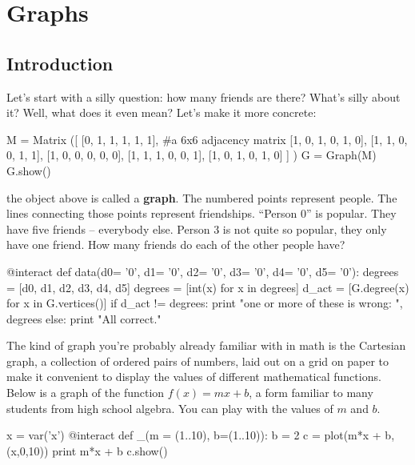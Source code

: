 \chapter{Graphs}

\section{Introduction}

Let's start with a silly question:  how many friends are there?
What's silly about it?  Well, what does it even mean?  Let's make it
more concrete:

\begin{sageverbatim}
M = Matrix ([ [0, 1, 1, 1, 1, 1],   #a 6x6 adjacency matrix
              [1, 0, 1, 0, 1, 0], 
              [1, 1, 0, 0, 1, 1],
              [1, 0, 0, 0, 0, 0],
              [1, 1, 1, 0, 0, 1],
              [1, 0, 1, 0, 1, 0] ] )
G = Graph(M)
G.show()
\end{sageverbatim}

the object above is called a \textbf{graph}.  The numbered points
represent people.  The lines connecting those points represent
friendships.  ``Person 0'' is popular.  They have five friends --
everybody else.  Person 3 is not quite so popular, they only have one
friend.  How many friends do each of the other people have?

\begin{sageverbatim}
 
@interact
def data(d0= '0', d1= '0', d2= '0', d3= '0', d4= '0', d5= '0'):
    degrees = [d0, d1, d2, d3, d4, d5]
    degrees = [int(x) for x in degrees]
    d_act = [G.degree(x) for x in G.vertices()]
    if d_act != degrees:
        print "one or more of these is wrong: ", degrees
    else:
        print "All correct."
\end{sageverbatim}


The kind of graph you're probably already familiar with in math is the
Cartesian graph, a collection of ordered pairs of numbers, laid out on
a grid on paper to make it convenient to display the values of
different mathematical functions.  Below is a graph of the function
$f(x) = mx + b$, a form familiar to many students from high school
algebra.  You can play with the values of $m$ and $b$.

\begin{sageverbatim}
x = var('x')
@interact
def _(m = (1..10), b=(1..10)):
    b = 2
    c = plot(m*x + b,(x,0,10))
    print m*x + b
    c.show()
\end{sageverbatim}












